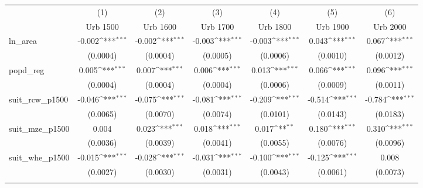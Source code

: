 {
\def\sym#1{\ifmmode^{#1}\else\(^{#1}\)\fi}
\begin{tabular}{l*{6}{c}}
\toprule
                    &\multicolumn{1}{c}{(1)}&\multicolumn{1}{c}{(2)}&\multicolumn{1}{c}{(3)}&\multicolumn{1}{c}{(4)}&\multicolumn{1}{c}{(5)}&\multicolumn{1}{c}{(6)}\\
                    &\multicolumn{1}{c}{Urb 1500}&\multicolumn{1}{c}{Urb 1600}&\multicolumn{1}{c}{Urb 1700}&\multicolumn{1}{c}{Urb 1800}&\multicolumn{1}{c}{Urb 1900}&\multicolumn{1}{c}{Urb 2000}\\
\midrule
ln\_area             &      -0.002\sym{***}&      -0.002\sym{***}&      -0.003\sym{***}&      -0.003\sym{***}&       0.043\sym{***}&       0.067\sym{***}\\
                    &    (0.0004)         &    (0.0004)         &    (0.0005)         &    (0.0006)         &    (0.0010)         &    (0.0012)         \\
\addlinespace
popd\_reg            &       0.005\sym{***}&       0.007\sym{***}&       0.006\sym{***}&       0.013\sym{***}&       0.066\sym{***}&       0.096\sym{***}\\
                    &    (0.0004)         &    (0.0004)         &    (0.0004)         &    (0.0006)         &    (0.0009)         &    (0.0011)         \\
\addlinespace
suit\_rcw\_p1500      &      -0.046\sym{***}&      -0.075\sym{***}&      -0.081\sym{***}&      -0.209\sym{***}&      -0.514\sym{***}&      -0.784\sym{***}\\
                    &    (0.0065)         &    (0.0070)         &    (0.0074)         &    (0.0101)         &    (0.0143)         &    (0.0183)         \\
\addlinespace
suit\_mze\_p1500      &       0.004         &       0.023\sym{***}&       0.018\sym{***}&       0.017\sym{**} &       0.180\sym{***}&       0.310\sym{***}\\
                    &    (0.0036)         &    (0.0039)         &    (0.0041)         &    (0.0055)         &    (0.0076)         &    (0.0096)         \\
\addlinespace
suit\_whe\_p1500      &      -0.015\sym{***}&      -0.028\sym{***}&      -0.031\sym{***}&      -0.100\sym{***}&      -0.125\sym{***}&       0.008         \\
                    &    (0.0027)         &    (0.0030)         &    (0.0031)         &    (0.0043)         &    (0.0061)         &    (0.0073)         \\
\addlinespace

\end{tabular}}
